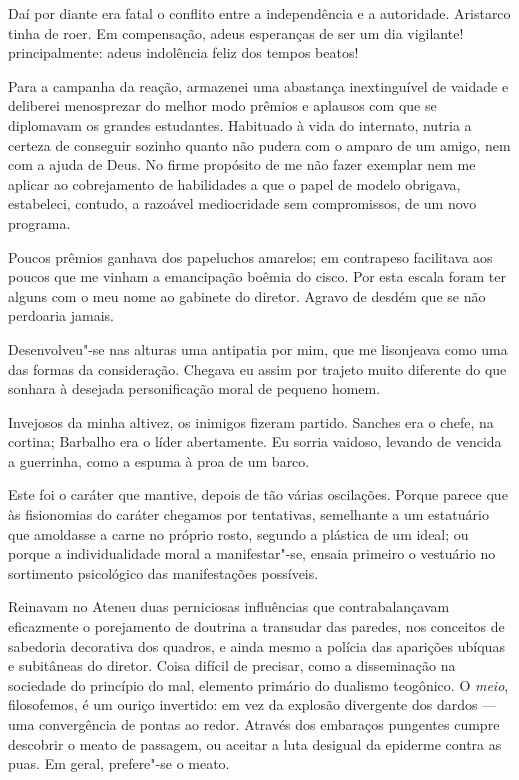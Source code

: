 Daí por diante
era fatal o conflito entre a independência e a autoridade. Aristarco
tinha de roer. Em compensação, adeus esperanças de ser um dia
vigilante! principalmente: adeus indolência feliz dos tempos beatos!

Para a campanha da reação, armazenei uma abastança inextinguível de
vaidade e deliberei menosprezar do melhor modo prêmios e aplausos com
que se diplomavam os grandes estudantes. Habituado à vida do internato,
nutria a certeza de conseguir sozinho quanto não pudera com o amparo de
um amigo, nem com a ajuda de Deus. No firme propósito de me não fazer
exemplar nem me aplicar ao cobrejamento de habilidades a que o papel de
modelo obrigava, estabeleci, contudo, a razoável mediocridade sem
compromissos, de um novo programa. 

Poucos prêmios ganhava dos
papeluchos amarelos; em contrapeso facilitava aos poucos que me vinham
a emancipação boêmia do cisco. Por esta escala foram ter alguns com o
meu nome ao gabinete do diretor. Agravo de desdém que se não perdoaria
jamais. 

Desenvolveu"-se nas alturas uma antipatia por mim, que me
lisonjeava como uma das formas da consideração. Chegava eu assim por
trajeto muito diferente do que sonhara à desejada personificação moral
de pequeno homem. 

Invejosos da minha altivez, os inimigos fizeram
partido. Sanches era o chefe, na cortina; Barbalho era o líder
abertamente. Eu sorria vaidoso, levando de vencida a guerrinha, como a
espuma à proa de um barco. 

Este foi o caráter que mantive, depois de
tão várias oscilações. Porque parece que às fisionomias do caráter
chegamos por tentativas, semelhante a um estatuário que amoldasse a
carne no próprio rosto, segundo a plástica de um ideal; ou porque a
individualidade moral a manifestar"-se, ensaia primeiro o vestuário no
sortimento psicológico das manifestações possíveis. 

Reinavam no Ateneu duas perniciosas influências 
que contrabalançavam eficazmente o
porejamento de doutrina a transudar das paredes, nos conceitos de
sabedoria decorativa dos quadros, e ainda mesmo a polícia das aparições
ubíquas e subitâneas do diretor. Coisa difícil de precisar, como a
disseminação na sociedade do princípio do mal, elemento primário do
dualismo teogônico. O \textit{meio}, filosofemos, é um ouriço invertido: em vez
da explosão divergente dos dardos --- uma convergência de pontas ao
redor. Através dos embaraços pungentes cumpre descobrir o meato de
passagem, ou aceitar a luta desigual da epiderme contra as puas. Em
geral, prefere"-se o meato. 

